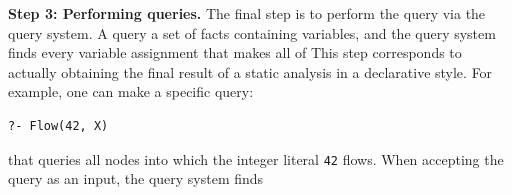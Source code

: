\smallskip
\textbf{Step 3: Performing queries.}
The final step is to perform the query via the query system.  A query 
a set of facts containing variables, and the query system finds every variable
assignment that makes all of 
This step corresponds to actually obtaining the
final result of a static analysis in a declarative style.
For example, one can make a specific query:

\begin{lstlisting}[style=mrule]
?- Flow(42, X)
\end{lstlisting}

\noindent
that queries all nodes into which the integer literal {\tt 42} flows.
When accepting the query as an input, the query system finds 

